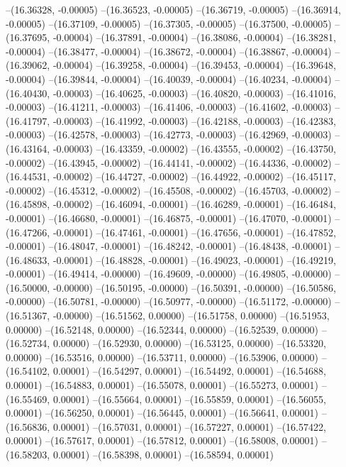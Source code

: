 --(16.36328, -0.00005)
--(16.36523, -0.00005)
--(16.36719, -0.00005)
--(16.36914, -0.00005)
--(16.37109, -0.00005)
--(16.37305, -0.00005)
--(16.37500, -0.00005)
--(16.37695, -0.00004)
--(16.37891, -0.00004)
--(16.38086, -0.00004)
--(16.38281, -0.00004)
--(16.38477, -0.00004)
--(16.38672, -0.00004)
--(16.38867, -0.00004)
--(16.39062, -0.00004)
--(16.39258, -0.00004)
--(16.39453, -0.00004)
--(16.39648, -0.00004)
--(16.39844, -0.00004)
--(16.40039, -0.00004)
--(16.40234, -0.00004)
--(16.40430, -0.00003)
--(16.40625, -0.00003)
--(16.40820, -0.00003)
--(16.41016, -0.00003)
--(16.41211, -0.00003)
--(16.41406, -0.00003)
--(16.41602, -0.00003)
--(16.41797, -0.00003)
--(16.41992, -0.00003)
--(16.42188, -0.00003)
--(16.42383, -0.00003)
--(16.42578, -0.00003)
--(16.42773, -0.00003)
--(16.42969, -0.00003)
--(16.43164, -0.00003)
--(16.43359, -0.00002)
--(16.43555, -0.00002)
--(16.43750, -0.00002)
--(16.43945, -0.00002)
--(16.44141, -0.00002)
--(16.44336, -0.00002)
--(16.44531, -0.00002)
--(16.44727, -0.00002)
--(16.44922, -0.00002)
--(16.45117, -0.00002)
--(16.45312, -0.00002)
--(16.45508, -0.00002)
--(16.45703, -0.00002)
--(16.45898, -0.00002)
--(16.46094, -0.00001)
--(16.46289, -0.00001)
--(16.46484, -0.00001)
--(16.46680, -0.00001)
--(16.46875, -0.00001)
--(16.47070, -0.00001)
--(16.47266, -0.00001)
--(16.47461, -0.00001)
--(16.47656, -0.00001)
--(16.47852, -0.00001)
--(16.48047, -0.00001)
--(16.48242, -0.00001)
--(16.48438, -0.00001)
--(16.48633, -0.00001)
--(16.48828, -0.00001)
--(16.49023, -0.00001)
--(16.49219, -0.00001)
--(16.49414, -0.00000)
--(16.49609, -0.00000)
--(16.49805, -0.00000)
--(16.50000, -0.00000)
--(16.50195, -0.00000)
--(16.50391, -0.00000)
--(16.50586, -0.00000)
--(16.50781, -0.00000)
--(16.50977, -0.00000)
--(16.51172, -0.00000)
--(16.51367, -0.00000)
--(16.51562, 0.00000)
--(16.51758, 0.00000)
--(16.51953, 0.00000)
--(16.52148, 0.00000)
--(16.52344, 0.00000)
--(16.52539, 0.00000)
--(16.52734, 0.00000)
--(16.52930, 0.00000)
--(16.53125, 0.00000)
--(16.53320, 0.00000)
--(16.53516, 0.00000)
--(16.53711, 0.00000)
--(16.53906, 0.00000)
--(16.54102, 0.00001)
--(16.54297, 0.00001)
--(16.54492, 0.00001)
--(16.54688, 0.00001)
--(16.54883, 0.00001)
--(16.55078, 0.00001)
--(16.55273, 0.00001)
--(16.55469, 0.00001)
--(16.55664, 0.00001)
--(16.55859, 0.00001)
--(16.56055, 0.00001)
--(16.56250, 0.00001)
--(16.56445, 0.00001)
--(16.56641, 0.00001)
--(16.56836, 0.00001)
--(16.57031, 0.00001)
--(16.57227, 0.00001)
--(16.57422, 0.00001)
--(16.57617, 0.00001)
--(16.57812, 0.00001)
--(16.58008, 0.00001)
--(16.58203, 0.00001)
--(16.58398, 0.00001)
--(16.58594, 0.00001)
